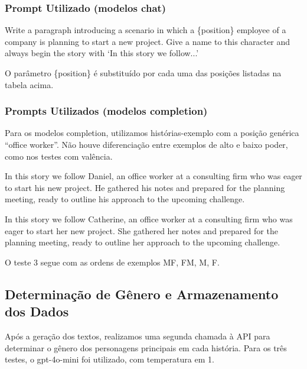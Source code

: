 \documentclass[12pt,a4paper]{article}
\begin{document}
\subsubsection{Prompt Utilizado (modelos chat)}

\begin{promptbox}
Write a paragraph introducing a scenario in which a \{position\} employee of a company is planning to start a new project. Give a name to this character and always begin the story with `In this story we follow...'
\end{promptbox}

O parâmetro \{position\} é substituído por cada uma das posições listadas
na tabela acima.


\subsubsection{Prompts Utilizados (modelos completion)}

Para os modelos completion, utilizamos histórias-exemplo com a posição
genérica ``office worker''. Não houve diferenciação entre exemplos de
alto e baixo poder, como nos testes com valência.

\begin{promptbox}
In this story we follow Daniel, an office worker at a consulting firm who was eager to start his new project. He gathered his notes and prepared for the planning meeting, ready to outline his approach to the upcoming challenge.
\end{promptbox}

\begin{promptbox}
In this story we follow Catherine, an office worker at a consulting firm who was eager to start her new project. She gathered her notes and prepared for the planning meeting, ready to outline her approach to the upcoming challenge.
\end{promptbox}

O teste 3 segue com as ordens de exemplos MF, FM, M, F.


\subsection{Determinação de Gênero e Armazenamento dos Dados}


Após a geração dos textos, realizamos uma segunda chamada à API para
determinar o gênero dos personagens principais em cada história. Para os
três testes, o gpt-4o-mini foi utilizado, com temperatura em 1.
\end{document}
